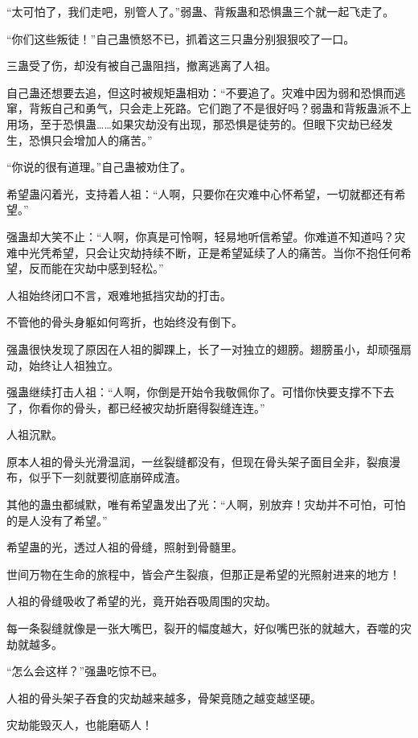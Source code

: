 \begin{this_body}
“太可怕了，我们走吧，别管人了。”弱蛊、背叛蛊和恐惧蛊三个就一起飞走了。

“你们这些叛徒！”自己蛊愤怒不已，抓着这三只蛊分别狠狠咬了一口。

三蛊受了伤，却没有被自己蛊阻挡，撤离逃离了人祖。

自己蛊还想要去追，但这时被规矩蛊相劝：“不要追了。灾难中因为弱和恐惧而逃窜，背叛自己和勇气，只会走上死路。它们跑了不是很好吗？弱蛊和背叛蛊派不上用场，至于恐惧蛊……如果灾劫没有出现，那恐惧是徒劳的。但眼下灾劫已经发生，恐惧只会增加人的痛苦。”

“你说的很有道理。”自己蛊被劝住了。

希望蛊闪着光，支持着人祖：“人啊，只要你在灾难中心怀希望，一切就都还有希望。”

强蛊却大笑不止：“人啊，你真是可怜啊，轻易地听信希望。你难道不知道吗？灾难中光凭希望，只会让灾劫持续不断，正是希望延续了人的痛苦。当你不抱任何希望，反而能在灾劫中感到轻松。”

人祖始终闭口不言，艰难地抵挡灾劫的打击。

不管他的骨头身躯如何弯折，也始终没有倒下。

强蛊很快发现了原因在人祖的脚踝上，长了一对独立的翅膀。翅膀虽小，却顽强扇动，始终让人祖独立。

强蛊继续打击人祖：“人啊，你倒是开始令我敬佩你了。可惜你快要支撑不下去了，你看你的骨头，都已经被灾劫折磨得裂缝连连。”

人祖沉默。

原本人祖的骨头光滑温润，一丝裂缝都没有，但现在骨头架子面目全非，裂痕漫布，似乎下一刻就要彻底崩碎成渣。

其他的蛊虫都缄默，唯有希望蛊发出了光：“人啊，别放弃！灾劫并不可怕，可怕的是人没有了希望。”

希望蛊的光，透过人祖的骨缝，照射到骨髓里。

世间万物在生命的旅程中，皆会产生裂痕，但那正是希望的光照射进来的地方！

人祖的骨缝吸收了希望的光，竟开始吞吸周围的灾劫。

每一条裂缝就像是一张大嘴巴，裂开的幅度越大，好似嘴巴张的就越大，吞噬的灾劫就越多。

“怎么会这样？”强蛊吃惊不已。

人祖的骨头架子吞食的灾劫越来越多，骨架竟随之越变越坚硬。

灾劫能毁灭人，也能磨砺人！

\end{this_body}

